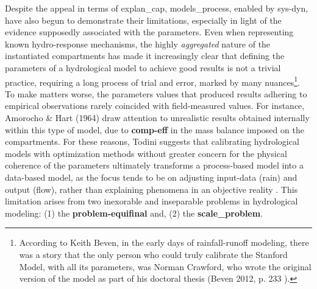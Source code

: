 \documentclass[./main_en.tex]{subfiles}
\begin{document}
\par Despite the appeal in terms of \gls{explan_cap}, \gls{models_process}, enabled by \gls{sys-dyn}, have also begun to demonstrate their limitations, especially in light of the evidence supposedly associated with the \gls{parameters}. Even when representing known \gls{hydro-response} mechanisms, the highly \textit{aggregated} nature of the instantiated compartments has made it increasingly clear that defining the \gls{parameters} of a hydrological \gls{model} to achieve good results is not a trivial practice, requiring a long process of trial and error, marked by many nuances\footnote{According to Keith Beven, in the early days of rainfall-runoff modeling, there was a story that the only person who could truly calibrate the Stanford Model, with all its \gls{parameters}, was Norman Crawford, who wrote the original version of the \gls{model} as part of his doctoral thesis (Beven 2012, p. 233 \cite{Beven2012}).}. To make matters worse, the \gls{parameters} values that produced results adhering to empirical observations rarely coincided with field-measured values. For instance, Amorocho \& Hart (1964) \cite{Amorocho1964a} draw attention to unrealistic results obtained internally within this type of \gls{model}, due to \textbf{\gls{comp-eff}} in the mass balance imposed on the compartments. For these reasons, Todini suggests that calibrating hydrological models with optimization methods without greater concern for the physical coherence of the \gls{parameters} ultimately transforms a process-based \gls{model} into a data-based \gls{model}, as the focus tends to be on adjusting \gls{input-data} (rain) and output (flow), rather than explaining phenomena in an objective reality \cite{Todini2007a}. This limitation arises from two inexorable and inseparable problems in hydrological modeling: (1) the \textbf{\gls{problem-equifinal}} and, (2) the \textbf{\gls{scale_problem}}.
\end{document}
